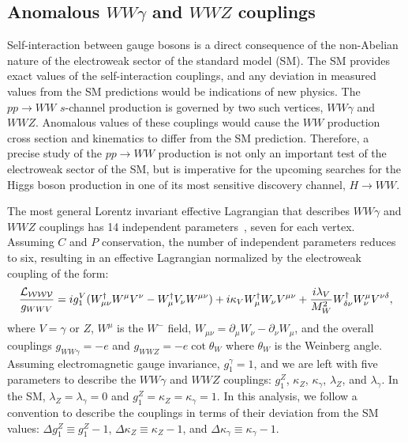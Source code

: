 \subsection{Anomalous $WW\gamma$ and $WWZ$ couplings}

Self-interaction between gauge bosons is a
direct consequence of the non-Abelian nature of the
electroweak sector of the standard model (SM). The
SM provides exact values of the self-interaction
couplings, and any deviation in measured values
from the SM predictions would be indications
of new physics. The $pp\to WW$ $s$-channel production
is governed by two such vertices, $WW\gamma$ and $WWZ$.
Anomalous values of these couplings would cause
the $WW$ production cross section and kinematics
to differ from the SM prediction. Therefore, a precise
study of the $pp\to WW$ production is not only
an important test of the electroweak sector of the SM, but
is imperative for the upcoming searches for the
Higgs boson production in one of its most sensitive
discovery channel, $H\to WW$.

The most general Lorentz invariant effective
Lagrangian that describes $WW\gamma$ and $WWZ$ couplings
has 14 independent parameters~\cite{hagiwara1,hagiwara2}, seven
for each vertex. Assuming $C$ and $P$ conservation, the number of
independent parameters reduces to six, resulting in
an effective Lagrangian normalized
by the electroweak coupling of the form:
\begin{equation}
\label{eq:atgc_lagrangian}
\frac{\cal L_{WWV}}{g_{WWV}} =
  ig_1^V(W_{\mu\nu}^\dagger W^\mu V^\nu - W^\dagger_\mu V_\nu W^{\mu\nu})
 + i\kappa_V W^\dagger_\mu W_\nu V^{\mu\nu} +
   \frac{i\lambda_V}{M_W^2}W^\dagger_{\delta\nu}W^\mu _\nu V^{\nu\delta},
\end{equation}
where $V = \gamma$ or $Z$, $W^\mu$ is the $W^-$ field,
$W_{\mu\nu} = \partial_\mu W_\nu - \partial_\nu W_\mu$, and the overall couplings
$g_{WW\gamma} = -e$ and $g_{WWZ} = -e \cot\theta_W$ where $\theta_W$
is the Weinberg angle. Assuming electromagnetic gauge
invariance, $g_1^\gamma = 1$, and we are left with five parameters to
describe the $WW\gamma$ and $WWZ$ couplings: $g_1^Z$, $\kappa_Z$,
$\kappa_\gamma$, $\lambda_Z$, and $\lambda_\gamma$. In the SM,
$\lambda_Z = \lambda_\gamma = 0$ and $g_1^Z = \kappa_Z = \kappa_\gamma = 1$.
In this analysis, we follow a convention to describe
the couplings in terms of their deviation from the SM values:
$\Delta g_1^Z \equiv g_1^Z - 1$, $\Delta \kappa_Z \equiv \kappa_Z - 1$,
and $\Delta \kappa_\gamma \equiv \kappa_\gamma -1$.

